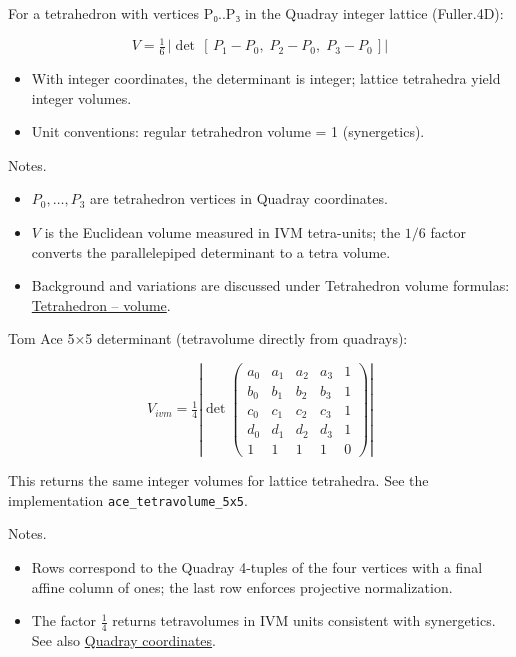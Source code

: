 \documentclass[
  10pt,
]{article}
\providecommand{\tightlist}{%
  \setlength{\itemsep}{0pt}\setlength{\parskip}{0pt}}
\begin{document}
For a tetrahedron with vertices P₀..P₃ in the Quadray integer lattice
(Fuller.4D):

\begin{equation}\label{eq:lattice_det}
V = \tfrac{1}{6}\,\left|\det\,[\,P_1 - P_0,\; P_2 - P_0,\; P_3 - P_0\,]\right|
\end{equation}

\begin{itemize}
\tightlist
\item
  With integer coordinates, the determinant is integer; lattice
  tetrahedra yield integer volumes.
\item
  Unit conventions: regular tetrahedron volume = 1 (synergetics).
\end{itemize}

Notes.

\begin{itemize}
\tightlist
\item
  \(P_0,\ldots,P_3\) are tetrahedron vertices in Quadray coordinates.
\item
  \(V\) is the Euclidean volume measured in IVM tetra-units; the \(1/6\)
  factor converts the parallelepiped determinant to a tetra volume.
\item
  Background and variations are discussed under Tetrahedron volume
  formulas:
  \href{https://en.wikipedia.org/wiki/Tetrahedron\#Volume}{Tetrahedron
  -- volume}.
\end{itemize}

Tom Ace 5×5 determinant (tetravolume directly from quadrays):

\begin{equation}\label{eq:ace5x5}
V_{ivm} = \tfrac{1}{4} \left| \det \begin{pmatrix}
 a_0 & a_1 & a_2 & a_3 & 1 \\
 b_0 & b_1 & b_2 & b_3 & 1 \\
 c_0 & c_1 & c_2 & c_3 & 1 \\
 d_0 & d_1 & d_2 & d_3 & 1 \\
 1 & 1 & 1 & 1 & 0
\end{pmatrix} \right|
\end{equation}

This returns the same integer volumes for lattice tetrahedra. See the
implementation \texttt{ace\_tetravolume\_5x5}.

Notes.

\begin{itemize}
\tightlist
\item
  Rows correspond to the Quadray 4-tuples of the four vertices with a
  final affine column of ones; the last row enforces projective
  normalization.
\item
  The factor \(\tfrac{1}{4}\) returns tetravolumes in IVM units
  consistent with synergetics. See also
  \href{https://en.wikipedia.org/wiki/Quadray_coordinates}{Quadray
  coordinates}.
\end{itemize}
\end{document}
